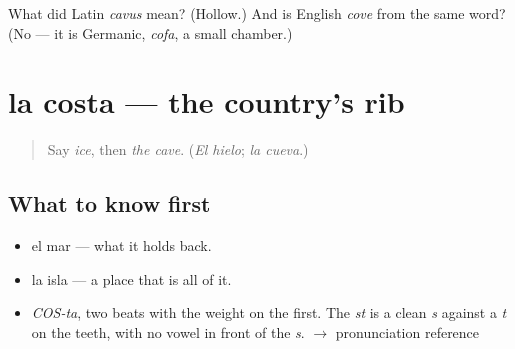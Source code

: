 \begin{tcolorbox}[breakable,colback=teal!4,colframe=teal!35!black,title={Before you move on}]
What did Latin \emph{cavus} mean? (Hollow.) And is English \emph{cove} from the same word? (No — it is Germanic, \emph{cofa}, a small chamber.)
\end{tcolorbox}
\section[la costa]{la costa — the country's rib}

\label{lesson:ES-C370-costa}



\begin{quote}
Say \emph{ice}, then \emph{the cave}. (\emph{El hielo}; \emph{la cueva}.)
\end{quote}

\subsection*{What to know first}
\begin{itemize}
\raggedright
  \item el mar — what it holds back.
  \item la isla — a place that is all of it.
\end{itemize}

\begin{sounds}
\begin{itemize}
\raggedright
  \item \emph{COS-ta}, two beats with the weight on the first. The \emph{st} is a clean \emph{s} against a \emph{t} on the teeth, with no vowel in front of the \emph{s}. $\to$ pronunciation reference
\end{itemize}
\end{sounds}

